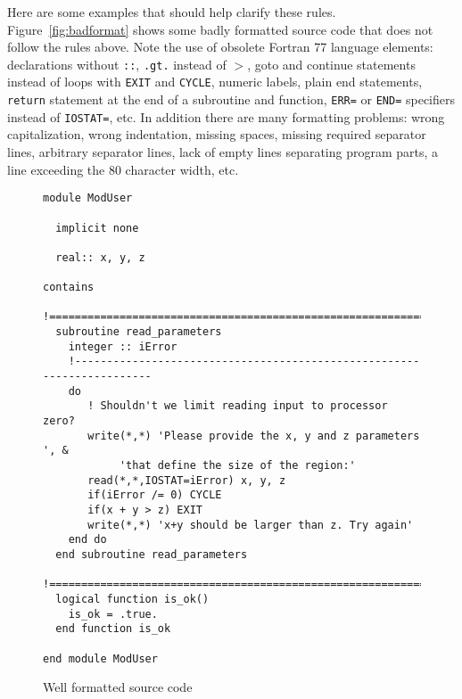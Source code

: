 \documentclass{article}
\begin{document}
Here are some examples that should help clarify these rules. 
Figure~\ref{fig:badformat} shows some badly formatted source 
code that does not follow the rules above.
Note the use of obsolete Fortran 77 language elements:
declarations without {\tt ::}, {\tt .gt.} instead of $>$, 
{goto} and {continue} statements instead of loops with 
{\tt EXIT} and {\tt CYCLE}, 
numeric labels, plain {end} statements, 
{\tt return} statement at the end of a subroutine and
function, {\tt ERR=} or {\tt END=} specifiers instead of {\tt IOSTAT=}, etc.
In addition there are many formatting problems:
wrong capitalization, wrong indentation, missing spaces, missing
required separator lines, arbitrary separator lines,
lack of empty lines separating program parts, a line
exceeding the 80 character width, etc.

\begin{figure}
\begin{verbatim}
module ModUser

  implicit none

  real:: x, y, z

contains
  !=========================================================================
  subroutine read_parameters 
    integer :: iError
    !-----------------------------------------------------------------------
    do
       ! Shouldn't we limit reading input to processor zero?
       write(*,*) 'Please provide the x, y and z parameters ', &
            'that define the size of the region:'
       read(*,*,IOSTAT=iError) x, y, z
       if(iError /= 0) CYCLE
       if(x + y > z) EXIT
       write(*,*) 'x+y should be larger than z. Try again'
    end do
  end subroutine read_parameters
  !=========================================================================
  logical function is_ok()
    is_ok = .true.
  end function is_ok

end module ModUser
\end{verbatim}
\caption{Well formatted source code}
\label{fig:goodformat}
\end{figure}
\end{document}
